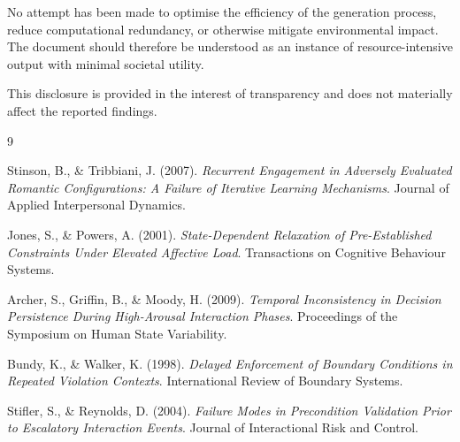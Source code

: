 \documentclass{article}
\begin{document}
	No attempt has been made to optimise the efficiency of the generation process, reduce computational redundancy, or otherwise mitigate environmental impact. The document should therefore be understood as an instance of resource-intensive output with minimal societal utility.
	
	This disclosure is provided in the interest of transparency and does not materially affect the reported findings.
	
	\begin{thebibliography}{9}
		
		Stinson, B., \& Tribbiani, J. (2007). 
		\textit{Recurrent Engagement in Adversely Evaluated Romantic Configurations: A Failure of Iterative Learning Mechanisms}. 
		Journal of Applied Interpersonal Dynamics.
		
		Jones, S., \& Powers, A. (2001). 
		\textit{State-Dependent Relaxation of Pre-Established Constraints Under Elevated Affective Load}. 
		Transactions on Cognitive Behaviour Systems.
		
		Archer, S., Griffin, B., \& Moody, H. (2009). 
		\textit{Temporal Inconsistency in Decision Persistence During High-Arousal Interaction Phases}. 
		Proceedings of the Symposium on Human State Variability.
		
		Bundy, K., \& Walker, K. (1998). 
		\textit{Delayed Enforcement of Boundary Conditions in Repeated Violation Contexts}. 
		International Review of Boundary Systems.
		
		Stifler, S., \& Reynolds, D. (2004). 
		\textit{Failure Modes in Precondition Validation Prior to Escalatory Interaction Events}. 
		Journal of Interactional Risk and Control.
		
	\end{thebibliography}
	
\end{document}
